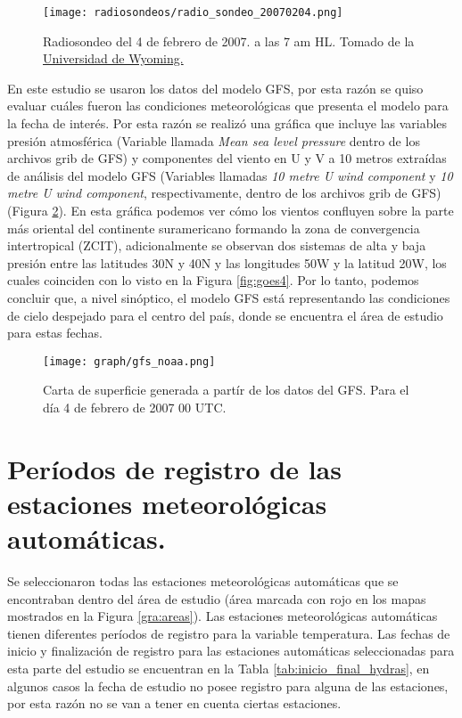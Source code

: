 \begin{figure}[H]
    \centering
    \texttt{[image: radiosondeos/radio\_sondeo\_20070204.png]}
    \caption{Radiosondeo del 4 de febrero de 2007. a las 7 am HL. Tomado de la \textcolor{blue}{\href{http://weather.uwyo.edu/cgi-bin/sounding?region=samer&TYPE=GIF\%3ASKEWT&YEAR=2007&MONTH=02&FROM=0412&TO=0412&STNM=80222}{Universidad de Wyoming.}}} 
    \label{fig:radiosondeo}
\end{figure}

En este estudio se usaron los datos del modelo GFS, por esta razón se quiso evaluar cuáles fueron las condiciones meteorológicas que presenta el modelo para la fecha de interés. Por esta razón se realizó una gráfica que incluye las variables presión atmosférica (Variable llamada \textit{Mean sea level pressure} dentro de los archivos grib de GFS) y componentes del viento en U y V a 10 metros extraídas de análisis del modelo GFS (Variables llamadas \textit{10 metre U wind component} y \textit{10 metre U wind component}, respectivamente, dentro de los archivos grib de GFS) (Figura \ref{fig:gfs_noaa}). En esta gráfica podemos ver cómo los vientos confluyen sobre la parte más oriental del continente suramericano formando la zona de convergencia intertropical (ZCIT), adicionalmente se observan dos sistemas de alta y baja presión entre las latitudes 30\degree N y 40\degree N y las longitudes 50\degree W y la latitud 20\degree W, los cuales coinciden con lo visto en la Figura \ref{fig:goes4}. Por lo tanto, podemos concluir que, a nivel sinóptico, el modelo GFS está representando las condiciones de cielo despejado para el centro del país, donde se encuentra el área de estudio para estas fechas.

\begin{figure}
    
    \centering
    \texttt{[image: graph/gfs\_noaa.png]}
    \caption{Carta de superficie generada a partír de los datos del GFS. Para el día 4 de febrero de 2007 00 UTC.}
    \label{fig:gfs_noaa}
\end{figure}


\section{Períodos de registro de las estaciones meteorológicas automáticas.}

Se seleccionaron todas las estaciones meteorológicas automáticas que se encontraban dentro del área de estudio (área marcada con rojo en los mapas mostrados en la Figura \ref{gra:areas}). Las estaciones meteorológicas automáticas tienen diferentes períodos de registro para la variable temperatura. Las fechas de inicio y finalización de registro para las estaciones automáticas seleccionadas para esta parte del estudio se encuentran en la Tabla \ref{tab:inicio_final_hydras}, en algunos casos la fecha de estudio no posee registro para alguna de las estaciones, por esta razón no se van a tener en cuenta ciertas estaciones.

